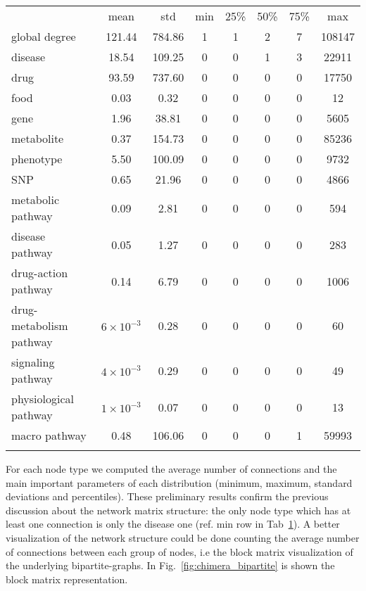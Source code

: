 \documentclass{standalone}
\begin{document}
\begin{table}
\centering
\begin{tabular}{lccccccc}
\hline\rowcolor{darkgrayrow}
                        & mean            &  std    &  min & 25\% & 50\% & 75\% &   max  \\

global degree           & 121.44          &  784.86 &    1 &    1 &    2 &    7 & 108147 \\
disease                 &  18.54          &  109.25 &    0 &    0 &    1 &    3 &  22911 \\
drug                    &  93.59          &  737.60 &    0 &    0 &    0 &    0 &  17750 \\
food                    &   0.03          &    0.32 &    0 &    0 &    0 &    0 &     12 \\
gene                    &   1.96          &   38.81 &    0 &    0 &    0 &    0 &   5605 \\
metabolite              &   0.37          &  154.73 &    0 &    0 &    0 &    0 &  85236 \\
phenotype               &   5.50          &  100.09 &    0 &    0 &    0 &    0 &   9732 \\
SNP                     &   0.65          &   21.96 &    0 &    0 &    0 &    0 &   4866 \\
metabolic pathway       &   0.09          &    2.81 &    0 &    0 &    0 &    0 &    594 \\
disease pathway         &   0.05          &    1.27 &    0 &    0 &    0 &    0 &    283 \\
drug-action pathway     &   0.14          &    6.79 &    0 &    0 &    0 &    0 &   1006 \\
drug-metabolism pathway &$6\times10^{-3}$ &    0.28 &    0 &    0 &    0 &    0 &     60 \\
signaling pathway       &$4\times10^{-3}$ &    0.29 &    0 &    0 &    0 &    0 &     49 \\
physiological pathway   &$1\times10^{-3}$ &    0.07 &    0 &    0 &    0 &    0 &     13 \\
macro pathway           &   0.48          &  106.06 &    0 &    0 &    0 &    1 &  59993 \\
\hline\\
\end{tabular}
\caption{%
}
\label{tab:chimera_degree}
\end{table}


For each node type we computed the average number of connections and the main important parameters of each distribution (minimum, maximum, standard deviations and percentiles).
These preliminary results confirm the previous discussion about the network matrix structure: the only node type which has at least one connection is only the disease one (ref. min row in Tab~\ref{tab:chimera_degree}).
A better visualization of the network structure could be done counting the average number of connections between each group of nodes, i.e the block matrix visualization of the underlying bipartite-graphs.
In Fig.~\ref{fig:chimera_bipartite} is shown the block matrix representation.
\end{document}
